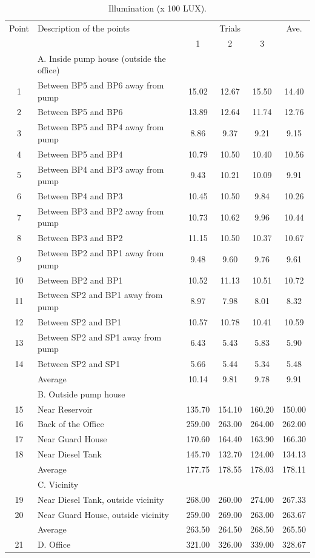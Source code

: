 \begin{table}[!h]
	\caption{Illumination (x 100 LUX).}
	\label{ch04_tbl_wem04}
	{\footnotesize
\begin{tabular}{c|l|c|c|c|c}
	\hline
	Point & Description of the points & \multicolumn{3}{c|}{Trials} & Ave. \\ 
	\cline{3-5}
	&  & 1 & 2 & 3 &  \\ 
	\hline
	& A. Inside pump house (outside the office) &  &  &  &  \\ 
	1 & Between BP5 and BP6 away from pump & 15.02 & 12.67 & 15.50 & 14.40 \\ 
	2 & Between BP5 and BP6 & 13.89 & 12.64 & 11.74 & 12.76 \\ 
	3 & Between BP5 and BP4 away from pump & 8.86 & 9.37 & 9.21 & 9.15 \\ 
	4 & Between BP5 and BP4 & 10.79 & 10.50 & 10.40 & 10.56 \\ 
	5 & Between BP4 and BP3 away from pump & 9.43 & 10.21 & 10.09 & 9.91 \\ 
	6 & Between BP4 and BP3 & 10.45 & 10.50 & 9.84 & 10.26 \\ 
	7 & Between BP3 and BP2 away from pump & 10.73 & 10.62 & 9.96 & 10.44 \\ 
	8 & Between BP3 and BP2 & 11.15 & 10.50 & 10.37 & 10.67 \\ 
	9 & Between BP2 and BP1 away from pump & 9.48 & 9.60 & 9.76 & 9.61 \\ 
	10 & Between BP2 and BP1 & 10.52 & 11.13 & 10.51 & 10.72 \\ 
	11 & Between SP2 and BP1 away from pump & 8.97 & 7.98 & 8.01 & 8.32 \\ 
	12 & Between SP2 and BP1 & 10.57 & 10.78 & 10.41 & 10.59 \\ 
	13 & Between SP2 and SP1 away from pump & 6.43 & 5.43 & 5.83 & 5.90 \\ 
	14 & Between SP2 and SP1 & 5.66 & 5.44 & 5.34 & 5.48 \\ 
	& Average & 10.14 & 9.81 & 9.78 & 9.91 \\ 
	\hline
	& B. Outside pump house &  &  &  &  \\ 
	15 & Near Reservoir & 135.70 & 154.10 & 160.20 & 150.00 \\ 
	16 & Back of the Office & 259.00 & 263.00 & 264.00 & 262.00 \\ 
	17 & Near Guard House & 170.60 & 164.40 & 163.90 & 166.30 \\ 
	18 & Near Diesel Tank & 145.70 & 132.70 & 124.00 & 134.13 \\ 
	& Average & 177.75 & 178.55 & 178.03 & 178.11 \\ 
	\hline
	& C. Vicinity &  &  &  &  \\ 
	19 & Near Diesel Tank, outside vicinity & 268.00 & 260.00 & 274.00 & 267.33 \\ 
	20 & Near Guard House, outside vicinity & 259.00 & 269.00 & 263.00 & 263.67 \\ 
	& Average & 263.50 & 264.50 & 268.50 & 265.50 \\ 
	21 & D. Office & 321.00 & 326.00 & 339.00 & 328.67 \\ 
	\hline
\end{tabular}

	}
\end{table}

